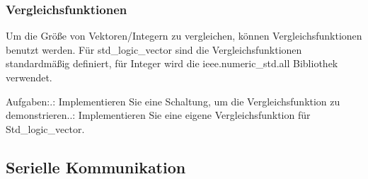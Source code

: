 \documentclass{article}
\begin{document}
\subsubsection{Vergleichsfunktionen}
Um die Gr\"o{\ss}e von Vektoren/Integern zu vergleichen, k\"onnen Vergleichsfunktionen benutzt werden. Für std\_logic\_vector sind die Vergleichsfunktionen standardm\"a{\ss}ig definiert, f\"ur Integer wird die ieee.numeric\_std.all Bibliothek verwendet.\newline

Aufgaben:.: Implementieren Sie eine Schaltung, um die Vergleichsfunktion zu demonstrieren..: Implementieren Sie eine eigene Vergleichsfunktion für Std\_logic\_vector.\newline

\subsection{Serielle Kommunikation}
\end{document}
